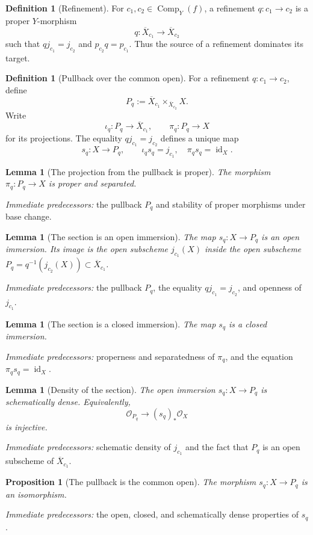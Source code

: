 \documentclass[10pt]{article}
\newtheorem{proposition}[theorem]{Proposition}
\newtheorem{lemma}[theorem]{Lemma}
\theoremstyle{definition}
\newtheorem{definition}[theorem]{Definition}
\newcommand{\Comp}{\operatorname{Comp}}
\newcommand{\pred}[1]{\par\smallskip\begingroup\footnotesize\raggedright
\emph{Immediate predecessors:} #1.\par\endgroup}
\begin{document}
\begin{definition}[Refinement]
For \(c_1,c_2\in\Comp_Y(f)\), a refinement
\(q:c_1\to c_2\) is a proper \(Y\)-morphism
\[
 q:\overline X_{c_1}\longrightarrow\overline X_{c_2}
\]
such that \(qj_{c_1}=j_{c_2}\) and \(p_{c_2}q=p_{c_1}\).  Thus the source
of a refinement dominates its target.
\end{definition}

\begin{definition}[Pullback over the common open]
For a refinement \(q:c_1\to c_2\), define
\[
 P_q:=\overline X_{c_1}\times_{\overline X_{c_2}}X.
\]
Write
\[
 \iota_q:P_q\longrightarrow\overline X_{c_1},\qquad
 \pi_q:P_q\longrightarrow X
\]
for its projections.  The equality \(qj_{c_1}=j_{c_2}\) defines a unique
map
\[
 s_q:X\longrightarrow P_q,\qquad
 \iota_qs_q=j_{c_1},\quad \pi_qs_q=\operatorname{id}_X.
\]
\end{definition}

\begin{lemma}[The projection from the pullback is proper]
The morphism \(\pi_q:P_q\to X\) is proper and separated.
\end{lemma}
\pred{the pullback \(P_q\) and stability of proper morphisms under base change}

\begin{lemma}[The section is an open immersion]
The map \(s_q:X\to P_q\) is an open immersion.  Its image is the open
subscheme \(j_{c_1}(X)\) inside the open subscheme
\(P_q=q^{-1}(j_{c_2}(X))\subset\overline X_{c_1}\).
\end{lemma}
\pred{the pullback \(P_q\), the equality \(qj_{c_1}=j_{c_2}\), and openness of \(j_{c_1}\)}

\begin{lemma}[The section is a closed immersion]
The map \(s_q\) is a closed immersion.
\end{lemma}
\pred{properness and separatedness of \(\pi_q\), and the equation \(\pi_qs_q=\operatorname{id}_X\)}

\begin{lemma}[Density of the section]
The open immersion \(s_q:X\to P_q\) is schematically dense.  Equivalently,
\[
 \mathcal O_{P_q}\longrightarrow (s_q)_*\mathcal O_X
\]
is injective.
\end{lemma}
\pred{schematic density of \(j_{c_1}\) and the fact that \(P_q\) is an open subscheme of \(\overline X_{c_1}\)}

\begin{proposition}[The pullback is the common open]
The morphism \(s_q:X\to P_q\) is an isomorphism.
\end{proposition}
\pred{the open, closed, and schematically dense properties of \(s_q\)}
\end{document}
